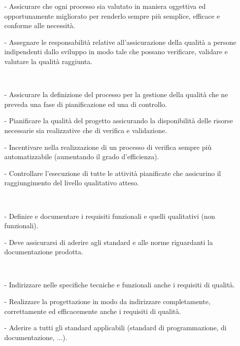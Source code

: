 \documentclass[a4paper, titlepage]{article}
\begin{document}
\begin{description}

\item {}
\begin{itemize}
\item[-]Assicurare che ogni processo sia valutato in maniera oggettiva ed opportunamente migliorato per renderlo sempre più semplice, efficace e conforme alle necessità.
\item[-]Assegnare le responsabilità relative all’assicurazione della qualità a persone indipendenti dallo sviluppo in modo tale che possano verificare, validare e valutare la qualità raggiunta.
\end{itemize}
\ 
\item {}
\begin{itemize}
\item[-]Assicurare la definizione del processo per la gestione della qualità che ne preveda una fase di pianificazione ed una di controllo.
\item[-]Pianificare la qualità del progetto assicurando la disponibilità delle risorse necessarie sia realizzative che di verifica e validazione.
\item[-] Incentivare nella realizzazione di un processo di verifica sempre più automatizzabile (aumentando il grado d'efficienza).
\item[-]Controllare l’esecuzione di tutte le attività pianificate che assicurino il raggiungimento del livello qualitativo atteso.
\end{itemize}
\ 
\item {}
\begin{itemize}
\item[-] Definire e documentare i requisiti funzionali e quelli qualitativi (non funzionali).
\item[-] Deve assicurarsi di aderire agli standard e alle norme riguardanti la documentazione prodotta.
\end{itemize}
\ 
\item \bold{\italics{Progettista}}
\begin{itemize}
\item[-] Indirizzare nelle specifiche tecniche e funzionali anche i requisiti di qualità.
\item[-] Realizzare la progettazione in modo da indirizzare completamente, correttamente ed efficacemente anche i requisiti di qualità.
\item[-] Aderire a tutti gli standard applicabili (standard di programmazione, di documentazione, ...).

\end{itemize}
\end{description}
\end{document}

